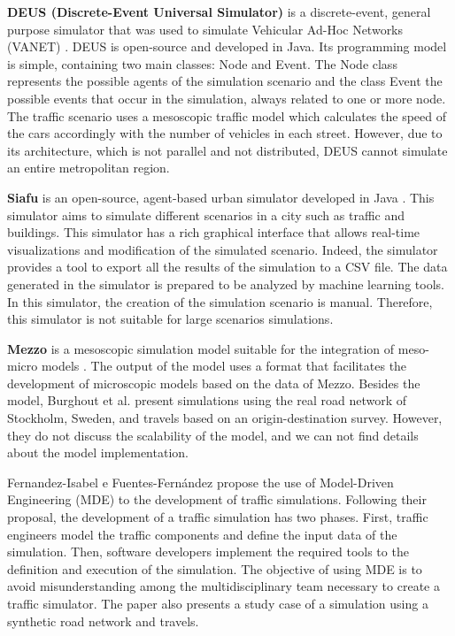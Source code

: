 \textbf{DEUS (Discrete-Event Universal Simulator)} is a discrete-event, general purpose simulator that was used to simulate Vehicular Ad-Hoc Networks (VANET) \citep{picone2012simulating}.  DEUS is open-source and developed in Java. Its programming model is simple, containing two main classes: Node and Event. The Node class represents the possible agents of the simulation scenario and the class Event the possible events that occur in the simulation, always related to one or more node. The traffic scenario uses a mesoscopic traffic model which calculates the speed of the cars accordingly with the number of vehicles in each street. However, due to its architecture, which is not parallel and not distributed, DEUS cannot simulate an entire metropolitan region.

\textbf{Siafu} is an open-source, agent-based urban simulator developed in Java \citep{nazario2014toward}. This simulator aims to simulate different scenarios in a city such as traffic and buildings. This simulator has a rich graphical interface that allows real-time visualizations and modification of the simulated scenario. Indeed, the simulator provides a tool to export all the results of the simulation to a CSV file. The data generated in the simulator is prepared to be analyzed by machine learning tools. In this simulator, the creation of the simulation scenario is manual. Therefore, this simulator is not suitable for large scenarios simulations.

\textbf{Mezzo} is a mesoscopic simulation model suitable for the integration of meso-micro models \citep{burghout2006discrete}. The output of the model uses a format that facilitates the development of microscopic models based on the data of Mezzo. Besides the model, Burghout et al. \citep{burghout2006discrete}  present simulations using the real road network of Stockholm, Sweden, and travels based on an origin-destination survey. However, they do not discuss the scalability of the model, and we can not find details about the model implementation.

Fernandez-Isabel e Fuentes-Fern\'andez \citep{fernandez2015model} propose the use of Model-Driven Engineering (MDE) to the development of traffic simulations. Following their proposal, the development of a traffic simulation has two phases. First, traffic engineers model the traffic components and define the input data of the simulation. Then, software developers implement the required tools to the definition and execution of the simulation. The objective of using MDE is to avoid misunderstanding among the multidisciplinary team necessary to create a traffic simulator. The paper also presents a study case of a simulation using a synthetic road network and travels. 

